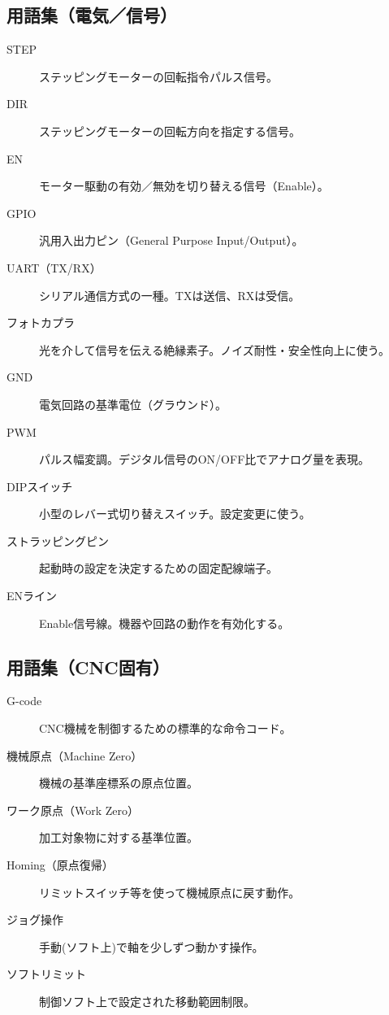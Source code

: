 \documentclass[uplatex,dvipdfmx]{ujarticle}
\begin{document}
\subsection*{用語集（電気／信号）}
\begin{description}
  \item[STEP] ステッピングモーターの回転指令パルス信号。
  \item[DIR] ステッピングモーターの回転方向を指定する信号。
  \item[EN] モーター駆動の有効／無効を切り替える信号（Enable）。
  \item[GPIO] 汎用入出力ピン（General Purpose Input/Output）。
  \item[UART（TX/RX）] シリアル通信方式の一種。TXは送信、RXは受信。
  \item[フォトカプラ] 光を介して信号を伝える絶縁素子。ノイズ耐性・安全性向上に使う。
  \item[GND] 電気回路の基準電位（グラウンド）。
  \item[PWM] パルス幅変調。デジタル信号のON/OFF比でアナログ量を表現。
  \item[DIPスイッチ] 小型のレバー式切り替えスイッチ。設定変更に使う。
  \item[ストラッピングピン] 起動時の設定を決定するための固定配線端子。
  \item[ENライン] Enable信号線。機器や回路の動作を有効化する。
\end{description}

\subsection*{用語集（CNC固有）}
\begin{description}
  \item[G-code] CNC機械を制御するための標準的な命令コード。
  \item[機械原点（Machine Zero）] 機械の基準座標系の原点位置。
  \item[ワーク原点（Work Zero）] 加工対象物に対する基準位置。
  \item[Homing（原点復帰）] リミットスイッチ等を使って機械原点に戻す動作。
  \item[ジョグ操作] 手動(ソフト上)で軸を少しずつ動かす操作。
  \item[ソフトリミット] 制御ソフト上で設定された移動範囲制限。
\end{description}
\end{document}
